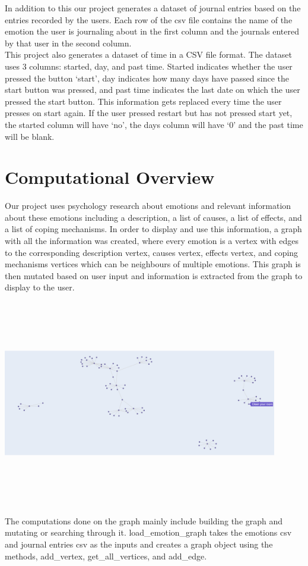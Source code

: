 \documentclass{article}
\begin{document}
    In addition to this our project generates a dataset of journal entries based on the entries recorded by the users. Each row of the csv file contains the name of the emotion the user is journaling about in the first column and the journals entered by that user in the second column. \\

    This project also generates a dataset of time in a CSV file format. The dataset uses 3 columns: started, day, and past time. Started indicates whether the user pressed the button ‘start’, day indicates how many days have passed since the start button was pressed, and past time indicates the last date on which the user pressed the start button. This information gets replaced every time the user presses on start again. If the user pressed restart but has not pressed start yet, the started column will have ‘no’, the days column will have ‘0’ and the past time will be blank.


    \section{Computational Overview}
    Our project uses psychology research about emotions and relevant information about these emotions including a description, a list of causes, a list of effects, and a list of coping mechanisms. In order to display and use this information, a graph with all the information was created, where every emotion is a vertex with edges to the corresponding description vertex, causes vertex, effects vertex, and coping mechanisms vertices which can be neighbours of multiple emotions. This graph is then mutated based on user input and information is extracted from the graph to display to the user.\\

    \begin{center}
        \includegraphics[width=12cm,height=9cm]{Images/graph.png}
    \end{center}
    The computations done on the graph mainly include building the graph and mutating or searching through it.
    load\_emotion\_graph takes the emotions csv and journal entries csv as the inputs and creates a graph object using the methods, add\_vertex, get\_all\_vertices, and add\_edge. \\
\end{document}
